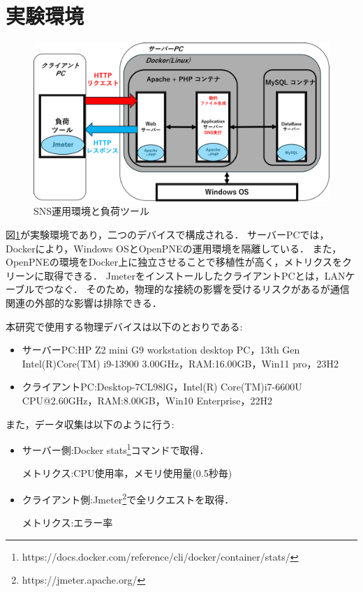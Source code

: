 \documentclass[twoside,twocolumn,10pt]{jarticle}  %
\begin{document}
\section{実験環境}
\label{sec:environment}
\begin{figure}
  \centering
  \includegraphics[scale=0.29]{figures/SNS_Docker.png}
  \vspace{-0.6cm}
  \caption{SNS運用環境と負荷ツール}
  \label{fig:1}
\end{figure}
図\ref{fig:1}が実験環境であり，二つのデバイスで構成される．
サーバーPCでは，Dockerにより，Windows OSとOpenPNEの運用環境を隔離している．
また，OpenPNEの環境をDocker上に独立させることで移植性が高く，メトリクスをクリーンに取得できる．
JmeterをインストールしたクライアントPCとは，LANケーブルでつなぐ．
そのため，物理的な接続の影響を受けるリスクがあるが通信関連の外部的な影響は排除できる．

本研究で使用する物理デバイスは以下のとおりである:
\begin{itemize}
  \setlength{\parskip}{0cm} %
  \setlength{\itemsep}{0cm} %
  \item サーバーPC:HP Z2 mini G9 workstation desktop PC，13th Gen Intel(R)Core(TM) i9-13900 3.00GHz，RAM:16.00GB，Win11 pro，23H2
  \item クライアントPC:Desktop-7CL98lG，Intel(R) Core(TM)i7-6600U CPU@2.60GHz，RAM:8.00GB，Win10 Enterprise，22H2
\end{itemize}
また，データ収集は以下のように行う:
\begin{itemize}
  \setlength{\parskip}{0cm} %
  \setlength{\itemsep}{0cm} %
  \item サーバー側:Docker stats\footnote{https://docs.docker.com/reference/cli/docker/container/stats/}コマンドで取得．\par
  メトリクス:CPU使用率，メモリ使用量(0.5秒毎)
  \item クライアント側:Jmeter\footnote{https://jmeter.apache.org/}で全リクエストを取得．\par
  メトリクス:エラー率
\end{itemize}
\end{document}

